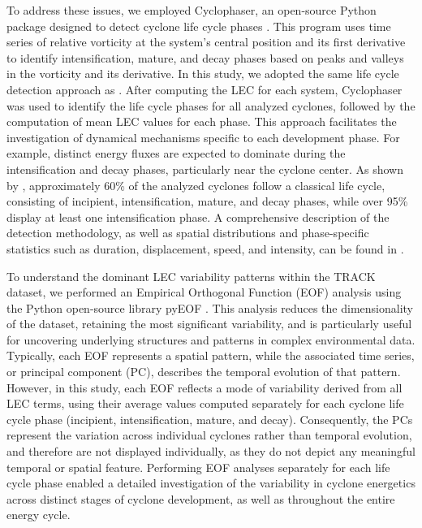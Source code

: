 \documentclass[pdflatex,sn-chicago]{sn-jnl}%
\theoremstyle{plain}
\theoremstyle{definition}
\theoremstyle{remark}
\theoremstyle{definition}
\begin{document}
To address these issues, we employed Cyclophaser, an open-source Python package designed to detect cyclone life cycle phases \citep{de2025cyclophaser}. This program uses time series of relative vorticity at the system's central position and its first derivative to identify intensification, mature, and decay phases based on peaks and valleys in the vorticity and its derivative. In this study, we adopted the same life cycle detection approach as \citet{couto2024new}. After computing the LEC for each system, Cyclophaser was used to identify the life cycle phases for all analyzed cyclones, followed by the computation of mean LEC values for each phase. This approach facilitates the investigation of dynamical mechanisms specific to each development phase. For example, distinct energy fluxes are expected to dominate during the intensification and decay phases, particularly near the cyclone center. As shown by \citet{couto2024new}, approximately 60\% of the analyzed cyclones follow a classical life cycle, consisting of incipient, intensification, mature, and decay phases, while over 95\% display at least one intensification phase. A comprehensive description of the detection methodology, as well as spatial distributions and phase-specific statistics such as duration, displacement, speed, and intensity, can be found in \citet{couto2024new}.

To understand the dominant LEC variability patterns within the TRACK dataset, we performed an Empirical Orthogonal Function (EOF) analysis \citep{fukuoka1951study, lorenz1956empirical} using the Python open-source library pyEOF \citep{zheng_2021}. This analysis reduces the dimensionality of the dataset, retaining the most significant variability, and is particularly useful for uncovering underlying structures and patterns in complex environmental data. Typically, each EOF represents a spatial pattern, while the associated time series, or principal component (PC), describes the temporal evolution of that pattern. However, in this study, each EOF reflects a mode of variability derived from all LEC terms, using their average values computed separately for each cyclone life cycle phase (incipient, intensification, mature, and decay). Consequently, the PCs represent the variation across individual cyclones rather than temporal evolution, and therefore are not displayed individually, as they do not depict any meaningful temporal or spatial feature. Performing EOF analyses separately for each life cycle phase enabled a detailed investigation of the variability in cyclone energetics across distinct stages of cyclone development, as well as throughout the entire energy cycle.
\end{document}
